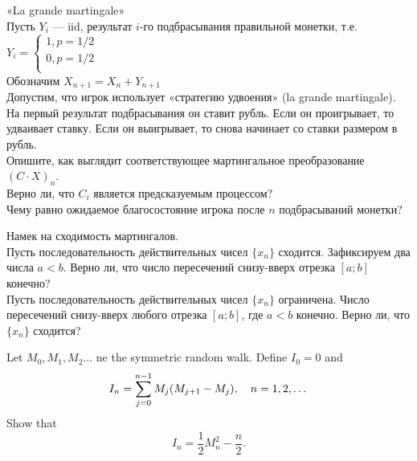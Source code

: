 \begin{problem}
 «La grande martingale» \\
Пусть $Y_{i}$ — iid, результат $i$-го подбрасывания правильной
монетки, т.е. $ Y_{i}=
\begin{cases}
1, p=1/2 \\
0, p=1/2 \\
\end{cases}$ \\
Обозначим $X_{n+1}=X_{n}+Y_{n+1}$ \\
Допустим, что игрок использует «стратегию удвоения» (la grande
martingale). На первый результат подбрасывания он ставит
рубль. Если он проигрывает, то удваивает ставку. Если он
выигрывает, то снова начинает со ставки размером в рубль. \\
Опишите, как выглядит соответствующее мартингальное преобразование
$(C\cdot X)_{n}$. \\
Верно ли, что $C_{i}$ является предсказуемым процессом? \\
Чему равно ожидаемое благосостояние игрока после $n$ подбрасываний
монетки?

\begin{sol}

\end{sol}
\end{problem}

\begin{problem}
 Намек на сходимость мартингалов. \\
Пусть последовательность действительных чисел $\{x_{n}\}$
сходится. Зафиксируем два числа $a<b$. Верно ли, что число
пересечений снизу-вверх отрезка $[a;b]$ конечно? \\
Пусть последовательность действительных чисел $\{x_{n}\}$
ограничена. Число пересечений снизу-вверх любого отрезка $[a;b]$,
где $a<b$ конечно. Верно ли, что $\{x_{n}\}$ сходится?

\begin{sol}

\end{sol}
\end{problem}

\begin{problem}
 Let $M_0,M_1,M_2\dots$ ne the symmetric random walk. Define $I_0=0$ and
\[
I_n=\sum\limits_{j=0}^{n-1} M_j(M_{j+1}-M_j),\quad n=1,2,\dots
\]
\ni Show that
\[
I_n=\frac{1}{2}M_n^2-\frac{n}{2}.
\]

\begin{sol}

\end{sol}
\end{problem}

